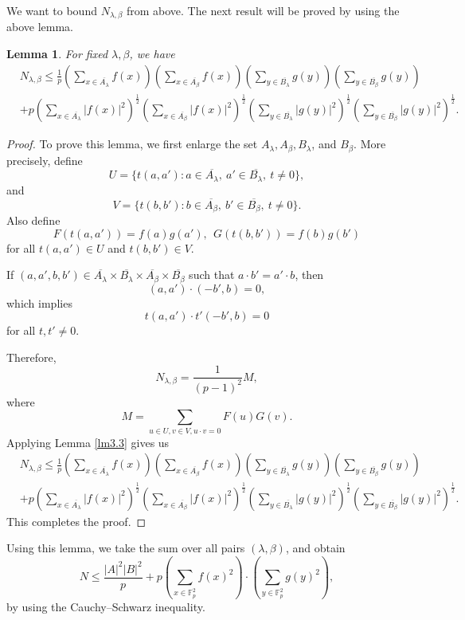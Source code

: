 \documentclass[11pt]{article}
\newtheorem{lemma}[theorem]{Lemma}
\def\l({\left(}
\def\r){\right)}
\begin{document}
We want to bound $N_{\lambda, \beta}$ from above. The next result will be proved by using the above lemma.
\begin{lemma}\label{weight-H}
    For fixed $\lambda, \beta$, we have 
    \begin{align*}
         &N_{\lambda, \beta}\le \frac{1}{p}\l(\sum_{x\in \overline{A_\lambda}}f(x)\r) \l(\sum_{x\in \overline{A_\beta}}f(x)\r) \l(\sum_{y\in \overline{B_\lambda}}g(y)\r) \l(\sum_{y\in \overline{B_\beta}}g(y)\r)\\
         &+p\l(\sum_{x\in \overline{A_\lambda}}|f(x)|^{2}\r)^{\frac{1}{2}}\l(\sum_{x\in \overline{A_\beta}}|f(x)|^2\r)^{\frac{1}{2}}\l(\sum_{y\in \overline{B_\lambda}}|g(y)|^2\r)^{\frac{1}{2}}\l(\sum_{y\in \overline{B_\beta}}|g(y)|^2\r)^{\frac{1}{2}}.
    \end{align*}
\end{lemma}
\begin{proof}
To prove this lemma, we first enlarge the set $A_\lambda, A_\beta, B_\lambda$, and $B_\beta$. More precisely, define 
\[U=\{t(a, a')\colon a\in \overline{A_{\lambda}}, ~a'\in \overline{B_{\lambda}},~ t\ne 0\},\]
and
\[V=\{t(b, b')\colon b\in \overline{A_{\beta}}, ~b'\in \overline{B_{\beta}},~ t\ne 0\}.\]
Also define 
\[F(t(a, a'))=f(a)g(a'), ~~G(t(b, b'))=f(b)g(b')\]
for all $t(a, a')\in U$ and $t(b, b')\in V$.

If $(a, a', b, b')\in \overline{A_\lambda}\times \overline{B_\lambda}\times\overline{A_\beta}\times \overline{B_\beta}$ such that $a\cdot b'=a'\cdot b$, then 
\[(a, a')\cdot (-b', b)=0,\]
which implies
\[t(a, a')\cdot t'(-b', b)=0\]
for all $t, t'\ne 0$.

Therefore, 
\[N_{\lambda, \beta}=\frac{1}{(p-1)^2}M,\]
where 
\[M=\sum_{u\in U, v\in V, u\cdot v=0}F(u)G(v).\]
Applying Lemma \ref{lm3.3} gives us 
\begin{align*}
         &N_{\lambda, \beta}\le \frac{1}{p}\l(\sum_{x\in \overline{A_\lambda}}f(x)\r) \l(\sum_{x\in \overline{A_\beta}}f(x)\r) \l(\sum_{y\in \overline{B_\lambda}}g(y)\r) \l(\sum_{y\in \overline{B_\beta}}g(y)\r)\\
         &+p\l(\sum_{x\in \overline{A_\lambda}}|f(x)|^{2}\r)^{\frac{1}{2}}\l(\sum_{x\in \overline{A_\beta}}|f(x)|^2\r)^{\frac{1}{2}}\l(\sum_{y\in \overline{B_\lambda}}|g(y)|^2\r)^{\frac{1}{2}}\l(\sum_{y\in \overline{B_\beta}}|g(y)|^2\r)^{\frac{1}{2}}.
    \end{align*}
This completes the proof. 
\end{proof}
Using this lemma, we take the sum over all pairs $(\lambda, \beta)$, and obtain 
\[N\le \frac{|A|^2|B|^2}{p}+p \left(\sum_{x\in \mathbb{F}_p^2}f(x)^2\right)\cdot \left(\sum_{y \in \mathbb{F}_p^2}g(y)^2\right),\]
by using the Cauchy--Schwarz inequality. 
\end{document}
